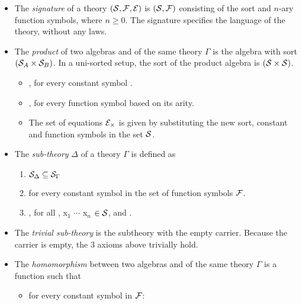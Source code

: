 \begin{itemize}
    \item The \emph{signature} of a theory $(\mathcal{S}, \mathcal{F}, \mathcal{E})$ is $(\mathcal{S}, \mathcal{F})$ consisting of the sort and $n$-ary function symbols, where $n \geq 0$. The signature specifies the language of the theory, without any laws. 
    \item The \emph{product} of two algebras  and  of the same theory $\Gamma$ is the algebra with sort $(\mathcal{S}_A \times \mathcal{S}_B)$. In a uni-sorted setup, the sort of the product algebra is $(\mathcal{S} \times \mathcal{S})$. 
    \begin{itemize}
    \item {}, for every constant symbol 
      . 
    \item {}, for every function symbol  based on its arity. 
    \item The set of equations $\mathcal{E}_\times$ is given by substituting the new sort, constant and function symbols in the set $\mathcal{S}$.  
    \end{itemize}
    \item The \emph{sub-theory} $\Delta$ of a theory $\Gamma$ is defined as 
    \begin{enumerate}
    \item $\mathcal{S}_\Delta \subseteq \mathcal{S}_\Gamma$ 
    \item {} \lstmath{=}  for every constant symbol in the set of function symbols $\mathcal{F}$. 
    \item {} \lstmath{=} , for all , {x$_1$ $\cdots$ x$_n$ $\in \mathcal{S}$}, and . 
    \end{enumerate}
    \item The \emph{trivial sub-theory} is the subtheory with the empty carrier. Because the carrier is empty, the $3$ axioms above trivially hold. 
    \item The \emph{homomorphism} between two algebras  and  of the same theory $\Gamma$ is a function  such that 
    \begin{itemize}
        \item for every constant symbol in $\mathcal{F}$:  

\end{itemize}
\end{itemize}

